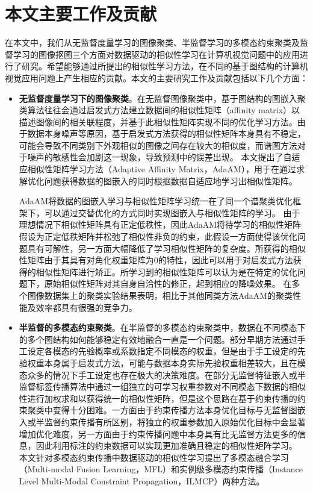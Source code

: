 \section{本文主要工作及贡献}
在本文中，我们从无监督度量学习的图像聚类、半监督学习的多模态约束聚类及监督学习的图像抠图三个方面对数据驱动的相似性学习在计算机视觉问题中的应用进行了研究。希望能够通过所提出的相似性学习方法，在不同的基于图结构的计算机视觉应用问题上产生相应的贡献。本文的主要研究工作及贡献包括以下几个方面：
\begin{itemize}
    \item {\bf{无监督度量学习下的图像聚类}}。在无监督图像聚类中，基于图结构的图嵌入聚类算法往往会通过启发式方法建立数据间的相似性矩阵（affinity matrix）以描述图像间的相关联程度，并基于此相似性矩阵实现不同的优化学习方法。由于数据本身噪声等原因，基于启发式方法获得的相似性矩阵本身具有不稳定，可能会导致不同类别下外观相似的图像之间存在较大的相似度，而谱图方法对于噪声的敏感性会加剧这一现象，导致预测中的误差出现。        
    本文提出了自适应相似性矩阵学习方法（Adaptive Affinity Matrix，AdaAM），用于在通过求解优化问题获得数据的图嵌入的同时根据数据自适应地学习出相似性矩阵。

    \indent AdaAM将数据的图嵌入学习与相似性矩阵学习统一在了同一个谱聚类优化框架下，可以通过交替优化的方式同时实现图嵌入与相似性矩阵的学习。
    由于理想情况下相似性矩阵具有正定低秩性，因此AdaAM将待学习的相似性矩阵假设为正定低秩矩阵并松弛了相似性非负的约束，此假设一方面使得该优化问题具有可解性，另一方面大幅降低了学习相似性矩阵的复杂度。所获得的相似性矩阵由于其具有对角化权重矩阵为$0$的特性，因此可以用于对启发式方法获得的相似性矩阵进行矫正。所学习到的相似性矩阵可以认为是在特定的优化问题下，原始相似性矩阵对其自身自洽性的修正，起到相应的降噪效果。
    在多个图像数据集上的聚类实验结果表明，相比于其他同类方法AdaAM的聚类性能及效率都具有很强的竞争力。
    \item {\bf{半监督的多模态约束聚类}}。在半监督的多模态约束聚类中，数据在不同模态下的多个图结构如何能够稳定有效地融合一直是一个问题。部分早期方法通过手工设定各模态的先验概率或系数指定不同模态的权重，但是由于手工设定的先验权重本身属于启发式方法，可能与数据本身实际先验权重相差较大，且在模态众多的情况下手工设定也存在极大的决策难度。在部分无监督特征嵌入或半监督标签传播算法中通过一组独立的可学习权重参数对不同模态下数据的相似性进行加权求和以获得统一的相似性矩阵\cite{wang2009unified,xu2016discriminatively,xu2014multi}，但是这个思路在基于约束传播的约束聚类中变得十分困难。一方面由于约束传播方法本身优化目标与无监督图嵌入或半监督约束传播有所区别，将独立的权重参数加入原始优化目标中会显著增加优化难度，另一方面由于约束传播问题中本身具有比无监督方法更多的信息，因此利用标注的约束数据可以实现更加准确且稳定的相似性矩阵学习。    
    本文针对多模态约束传播中数据驱动的相似性学习提出了多模态融合学习（Multi-modal Fusion Learning，MFL）和实例级多模态约束传播（Instance Level Multi-Modal Constraint Propagation，ILMCP）两种方法。


\end{itemize}
